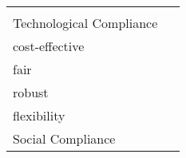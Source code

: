 
\begin{tabular}{m{2.8cm}lllllll}
                                            & \textbf{\nameref{ssec:bitcoin}} & \textbf{\nameref{ssec:ethereum}} & \textbf{\nameref{ssec:neo}} & \textbf{\nameref{ssec:tron}} & \textbf{\nameref{ssec:libra}} & \textbf{\nameref{ssec:hyperledger}} & \textbf{\nameref{ssec:r3corda}} \\
\multicolumn{8}{l}{\cellcolor[HTML]{C0C0C0}Technological Compliance}                                                                                                                                                                                                                                                                                                             \\
cost-effective                              & \multicolumn{1}{c}{}                         & \multicolumn{1}{c}{}                          & \multicolumn{1}{c}{}                     & \multicolumn{1}{c}{}                      & \multicolumn{1}{c}{}                       & \multicolumn{1}{c}{}                             & \multicolumn{1}{c}{}                         \\
fair                                        & \multicolumn{1}{c}{}                         & \multicolumn{1}{c}{}                          & \multicolumn{1}{c}{}                     & \multicolumn{1}{c}{}                      & \multicolumn{1}{c}{}                       & \multicolumn{1}{c}{}                             & \multicolumn{1}{c}{}                         \\
robust                                      & \multicolumn{1}{c}{}                         & \multicolumn{1}{c}{}                          & \multicolumn{1}{c}{}                     & \multicolumn{1}{c}{}                      & \multicolumn{1}{c}{}                       & \multicolumn{1}{c}{}                             & \multicolumn{1}{c}{}                         \\
flexibility                                 &                                              &                                               &                                          &                                           &                                            &                                                  &                                              \\
\multicolumn{8}{l}{\cellcolor[HTML]{C0C0C0}Social Compliance}                                                                                                                                                                                                                                                                                                                    \\

\end{tabular}
